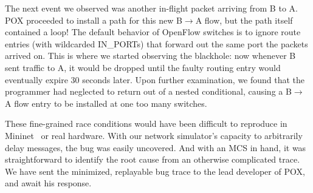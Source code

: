 The next event we observed was another in-flight packet arriving from B to
A. POX
proceeded to install a path for this new B$\rightarrow$A flow, but the
path itself contained a loop! The default behavior of
OpenFlow switches is to ignore route entries (with wildcarded
IN\_PORTs) that forward out the
same port the packets arrived on. This is where we started observing the blackhole:
now whenever B sent traffic to A, it would be dropped until
the faulty routing entry would eventually expire 30 seconds later.
Upon further examination, we found that the programmer had neglected to return out
of a nested conditional, causing a B$\rightarrow$A flow entry to be
installed at one too many switches.

These fine-grained race conditions would have been difficult to reproduce
in Mininet~\cite{handigol2012reproducible} or real hardware. With our
network simulator's capacity to arbitrarily delay messages, the bug was easily uncovered. And with
an MCS in hand, it was straightforward to identify the root cause from an
otherwise complicated trace.
We have sent the minimized, replayable bug trace to the lead
developer of POX, and await his response.
